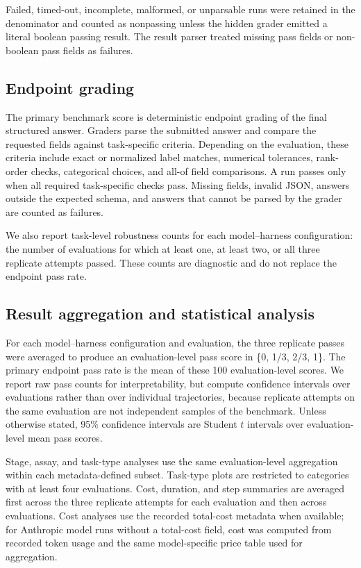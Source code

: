 \documentclass[10pt,letterpaper]{article}
\begin{document}
Failed, timed-out, incomplete, malformed, or unparsable runs were retained in
the denominator and counted as nonpassing unless the hidden grader emitted a
literal boolean passing result. The result parser treated missing pass fields
or non-boolean pass fields as failures.

\subsection{Endpoint grading}

The primary benchmark score is deterministic endpoint grading of the final
structured answer. Graders parse the submitted answer and compare the requested
fields against task-specific criteria. Depending on the evaluation, these
criteria include exact or normalized label matches, numerical tolerances,
rank-order checks, categorical choices, and all-of field comparisons. A run
passes only when all required task-specific checks pass. Missing fields,
invalid JSON, answers outside the expected schema, and answers that cannot be
parsed by the grader are counted as failures.

We also report task-level robustness counts for each model--harness
configuration: the number of evaluations for which at least one, at least two,
or all three replicate attempts passed. These counts are diagnostic and do not
replace the endpoint pass rate.

\subsection{Result aggregation and statistical analysis}

For each model--harness configuration and evaluation, the three replicate
passes were averaged to produce an evaluation-level pass score in
\{0, 1/3, 2/3, 1\}. The primary endpoint pass rate is the mean of these 100
evaluation-level scores. We report raw pass counts for interpretability, but
compute confidence intervals over evaluations rather than over individual
trajectories, because replicate attempts on the same evaluation are not
independent samples of the benchmark. Unless otherwise stated, 95\% confidence
intervals are Student $t$ intervals over evaluation-level mean pass scores.

Stage, assay, and task-type analyses use the same evaluation-level aggregation
within each metadata-defined subset. Task-type plots are restricted to
categories with at least four evaluations. Cost, duration, and step summaries
are averaged first across the three replicate attempts for each evaluation and
then across evaluations. Cost analyses use the recorded total-cost metadata
when available; for Anthropic model runs without a total-cost field, cost was
computed from recorded token usage and the same model-specific price table used
for aggregation.
\end{document}
